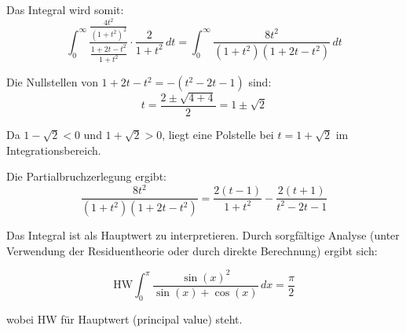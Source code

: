 \documentclass{article}
\begin{document}
Das Integral wird somit:
$$\int_0^\infty \frac{\frac{4t^2}{(1+t^2)^2}}{\frac{1 + 2t - t^2}{1+t^2}} \cdot \frac{2}{1+t^2}\,dt = \int_0^\infty \frac{8t^2}{(1+t^2)(1 + 2t - t^2)}\,dt$$

Die Nullstellen von $1 + 2t - t^2 = -(t^2 - 2t - 1)$ sind:
$$t = \frac{2 \pm \sqrt{4 + 4}}{2} = 1 \pm \sqrt{2}$$

Da $1 - \sqrt{2} < 0$ und $1 + \sqrt{2} > 0$, liegt eine Polstelle bei $t = 1 + \sqrt{2}$ im Integrationsbereich.

Die Partialbruchzerlegung ergibt:
$$\frac{8t^2}{(1+t^2)(1 + 2t - t^2)} = \frac{2(t-1)}{1+t^2} - \frac{2(t+1)}{t^2 - 2t - 1}$$

Das Integral ist als Hauptwert zu interpretieren. Durch sorgfältige Analyse (unter Verwendung der Residuentheorie oder durch direkte Berechnung) ergibt sich:

$$\text{HW}\int_0^\pi \frac{\sin(x)^2}{\sin(x)+\cos(x)}\,dx = \frac{\pi}{2}$$

wobei HW für Hauptwert (principal value) steht.
\end{document}
